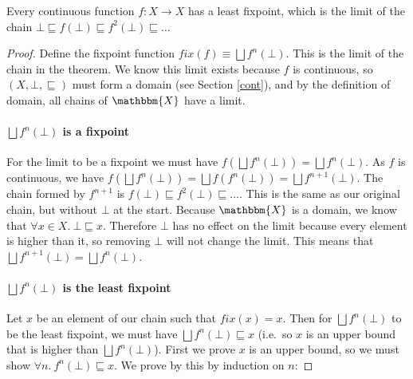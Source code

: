
\begin{thm}
Every continuous function $f : X \to X$ has a least fixpoint, which is the limit of the chain $\bot \sqsubseteq f(\bot) \sqsubseteq f^2(\bot) \sqsubseteq \dots$
\end{thm}

\begin{proof}
 Define the fixpoint function $fix(f) \equiv \bigsqcup f^n (\bot)$. This is the limit of the chain in the theorem. We know this limit exists because $f$ is continuous, so $(X, \bot, \sqsubseteq)$ must form a domain (see Section \ref{cont}), and by the definition of domain, all chains of $\mathbbm{X}$ have a limit. 



\paragraph{$\bigsqcup f^n (\bot)$ is a fixpoint}
For the limit to be a fixpoint we must have  $f( \bigsqcup f^n (\bot)) =  \bigsqcup f^n (\bot)$.  As $f$ is continuous, we have $f( \bigsqcup f^n (\bot)) = \bigsqcup f(f^n(\bot)) = \bigsqcup f^{n+1}(\bot)$. The chain formed by $f^{n+1}$ is $f(\bot)  \sqsubseteq f^2(\bot) \sqsubseteq \dots$. This is the same as our original chain, but without $\bot$ at the start. Because $\mathbbm{X}$ is a domain, we know that $\forall x \in X. \ \bot \sqsubseteq x$. Therefore $\bot$ has no effect on the limit because every element is higher than it, so removing $\bot$ will not change the limit. This means that $\bigsqcup f^{n+1} (\bot) = \bigsqcup f^n(\bot)$.

\paragraph{$\bigsqcup f^n (\bot)$ is the least fixpoint}
Let $x$ be an element of our chain such that $fix(x) = x$. Then for $\bigsqcup f^n (\bot)$ to be the least fixpoint, we must have $\bigsqcup f^n (\bot) \sqsubseteq x$ (i.e.\ so $x$ is an upper bound that is higher than $\bigsqcup f^n (\bot)$). First we prove $x$ is an upper bound, so  we must show $\forall n. \ f^n(\bot) \sqsubseteq x$. We prove by this by induction on $n$:


\end{proof}
